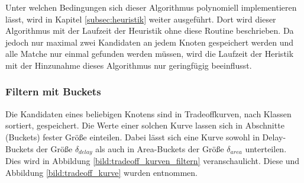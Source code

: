 \documentclass[11pt, a4paper, german]{article}
\begin{document}
Unter welchen Bedingungen sich dieser Algorithmus polynomiell implementieren lässt, wird in Kapitel \ref{subsec:heuristik} weiter ausgeführt. Dort wird dieser Algorithmus mit der Laufzeit der Heuristik ohne diese Routine beschrieben. Da jedoch nur maximal zwei Kandidaten an jedem Knoten gespeichert werden und alle Matche nur einmal gefunden werden müssen, wird die Laufzeit der Heristik mit der Hinzunahme dieses Algorithmus nur geringfügig beeinflusst.\\

\subsubsection{Filtern mit Buckets}
\label{subsubsec:filtern}
Die Kandidaten eines beliebigen Knotens sind in Tradeoffkurven, nach Klassen sortiert, gespeichert. Die Werte einer solchen Kurve lassen sich in Abschnitte (Buckets) fester Größe einteilen. Dabei lässt sich eine Kurve sowohl in Delay-Buckets  der Größe $\delta_{delay}$ als auch in Area-Buckets der Größe $\delta_{area}$ unterteilen. Dies wird in Abbildung \ref{bild:tradeoff_kurven_filtern} veranschaulicht. Diese und Abbildung \ref{bild:tradeoff_kurve} wurden \cite{Elbert} entnommen. \\
\end{document}
